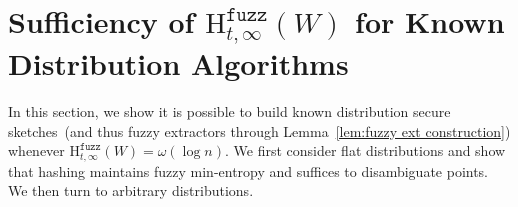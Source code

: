 \documentclass[11pt]{article}
\newcommand{\lemref}[1]{\mbox{Lemma~\ref{#1}}}
\newcommand{\class}[1]{{\ensuremath{\mathsf{#1}}}}
\newcommand{\sketch}{\ensuremath{\class{SS}}\xspace}
\newcommand{\rec}{\ensuremath{\class{Rec}}\xspace}
\newcommand{\dis}{\ensuremath{\mathsf{dis}}}
\newcommand{\Hoo}{\mathrm{H}_\infty}
\newcommand{\Hfuzz}{\mathrm{H}^{\mathtt{fuzz}}_{t,\infty}}
\newtheorem{lemma}[theorem]{Lemma}
\newtheorem{definition}[theorem]{Definition}
\newcommand{\authnote}[2]{{\textcolor{red}{\textsf{#1 notes: }\textcolor{blue}{ #2}}\marginpar{\textcolor{red}{\textbf{!!!!!}}}}}
\newcommand{\authnote}[2]{}
\newcommand{\bnote}[1]{{\authnote{Ben}{#1}}}
\begin{document}
\section{Sufficiency of $\Hfuzz(W)$ for Known Distribution Algorithms}
\label{sec:known distributions}
In this section, we show it is possible to build known distribution secure sketches~(and thus fuzzy extractors through \lemref{lem:fuzzy ext construction}) whenever $\Hfuzz(W)= \omega(\log n)$.
We first consider flat distributions and show that hashing maintains fuzzy min-entropy and suffices to disambiguate points.  We then turn to arbitrary distributions.
%
\end{document}
